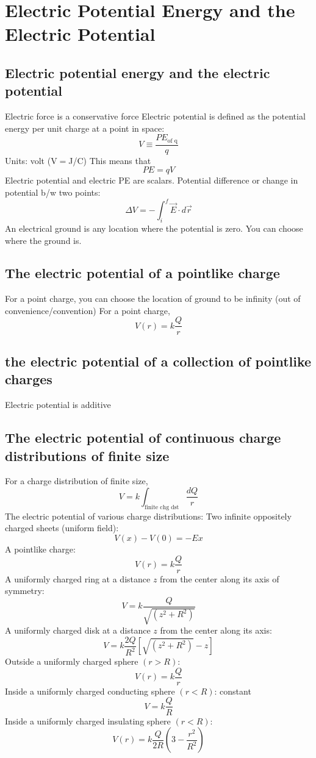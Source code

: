 \documentclass[twocolumn]{article}
\begin{document}
\section{Electric Potential Energy and the Electric Potential}
\subsection{Electric potential energy and the electric potential}
\begin{outline}
	\1 Electric force is a conservative force
	\1 Electric potential is defined as the potential energy per unit charge at a point in space: \[V\equiv\dfrac{PE_{\text{of q}}}{q}\] Units: volt (V$=$J/C)
	\1 This means that \[PE=qV\]
	\1 Electric potential and electric PE are scalars.
	\1 Potential difference or change in potential b/w two points: \[\Delta V=-\int^f_i\vec{E}\cdot d\vec{r}\]
	\1 An electrical ground is any location where the potential is zero. You can choose where the ground is. 
\end{outline}
\subsection{The electric potential of a pointlike charge}
\begin{outline}
	\1 For a point charge, you can choose the location of ground to be infinity (out of convenience/convention)
	\1 For a point charge, \[V(r)=k\dfrac{Q}{r}\]
\end{outline}
\subsection{the electric potential of a collection of pointlike charges}
\begin{outline}
	\1 Electric potential is additive
\end{outline}
\subsection{The electric potential of continuous charge distributions of finite size}
\begin{outline}
	\1 For a charge distribution of finite size, \[V=k\int_{\text{finite chg dst}}\dfrac{dQ}{r}\]
	\1 The electric potential of various charge distributions: 
		\2 Two infinite oppositely charged sheets (uniform field): \[V(x)-V(0)=-Ex\]
		\2 A pointlike charge: \[V(r)=k\dfrac{Q}{r}\]
		\2 A uniformly charged ring at a distance $z$ from the center along its axis of symmetry: \[V=k\dfrac{Q}{\sqrt{\left(z^2+R^2\right)}}\]
		\2 A uniformly charged disk at a distance $z$ from the center along its axis: \[V=k\dfrac{2Q}{R^2}\left[\sqrt{\left(z^2+R^2\right)}-z\right]\]
		\2 Outside a uniformly charged sphere \((r>R)\): \[V(r)=k\dfrac{Q}{r}\]
		\2 Inside a uniformly charged conducting sphere \((r<R)\): constant \[V=k\dfrac{Q}{R}\]
		\2 Inside a uniformly charged insulating sphere \((r<R)\): \[V(r)=k\dfrac{Q}{2R}\left(3-\dfrac{r^2}{R^2}\right)\]

\end{outline}
\end{document}

